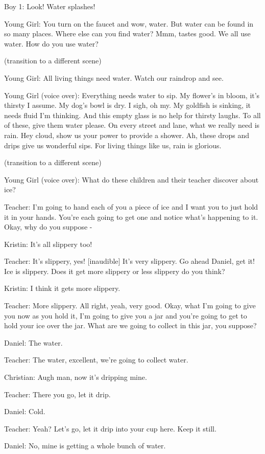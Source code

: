 Boy 1: Look! Water splashes!

Young Girl: You turn on the faucet and wow, water. But water can be found in so many places. Where else can you find water? Mmm, tastes good. We all use water. How do you use water?

(transition to a different scene)

Young Girl: All living things need water. Watch our raindrop and see.

Young Girl (voice over): Everything needs water to sip. My flower's in bloom, it's thirsty I assume. My dog's bowl is dry. I sigh, oh my. My goldfish is sinking, it needs fluid I'm thinking. And this empty glass is no help for thirsty laughs. To all of these, give them water please. On every street and lane, what we really need is rain. Hey cloud, show us your power to provide a shower. Ah, these drops and drips give us wonderful sips. For living things like us, rain is glorious.

(transition to a different scene)

Young Girl (voice over): What do these children and their teacher discover about ice?

Teacher: I'm going to hand each of you a piece of ice and I want you to just hold it in your hands. You're each going to get one and notice what's happening to it. Okay, why do you suppose -

Kristin: It's all slippery too!

Teacher: It's slippery, yes! [inaudible] It's very slippery. Go ahead Daniel, get it! Ice is slippery. Does it get more slippery or less slippery do you think?

Kristin: I think it gets more slippery.

Teacher: More slippery. All right, yeah, very good. Okay, what I'm going to give you now as you hold it, I'm going to give you a jar and you're going to get to hold your ice over the jar. What are we going to collect in this jar, you suppose?

Daniel: The water.

Teacher: The water, excellent, we're going to collect water.

Christian: Augh man, now it's dripping mine.

Teacher: There you go, let it drip.

Daniel: Cold.

Teacher: Yeah? Let's go, let it drip into your cup here. Keep it still.

Daniel: No, mine is getting a whole bunch of water.

